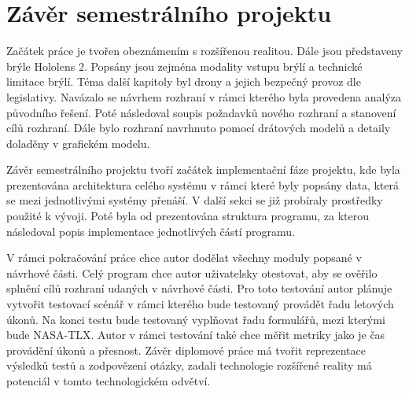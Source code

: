 \chapter{Závěr semestrálního projektu}
Začátek práce je tvořen obeznámením s rozšířenou realitou. Dále jsou představeny brýle Hololens 2. Popsány jsou zejména modality vstupu brýlí a technické limitace brýlí. Téma další kapitoly byl drony a jejich bezpečný provoz dle legislativy. Navázalo se návrhem rozhraní v rámci kterého byla provedena analýza původního řešení. Poté následoval soupis požadavků nového rozhraní a stanovení cílů rozhraní. Dále bylo rozhraní navrhnuto pomocí drátových modelů a detaily doladěny v grafickém modelu. 

Závěr semestrálního projektu tvoří začátek implementační fáze projektu, kde byla prezentována architektura celého systému v rámci které byly popsány data, která se mezi jednotlivými systémy přenáší. V další sekci se již probíraly prostředky použité k vývoji. Poté byla od prezentována struktura programu, za kterou následoval popis implementace jednotlivých částí programu. 

V rámci pokračování práce chce autor dodělat všechny moduly popsané v návrhové části. Celý program chce autor uživatelsky otestovat, aby se ověřilo splnění cílů rozhraní udaných v návrhové části. Pro toto testování autor plánuje vytvořit testovací scénář v rámci kterého bude testovaný provádět řadu letových úkonů. Na konci testu bude testovaný vyplňovat řadu formulářů, mezi kterými bude NASA-TLX. Autor v rámci testování také chce měřit metriky jako je čas provádění úkonů a přesnost. Závěr diplomové práce má tvořit reprezentace výsledků testů a zodpovězení otázky, zadali technologie rozšířené reality má potenciál v tomto technologickém odvětví.

